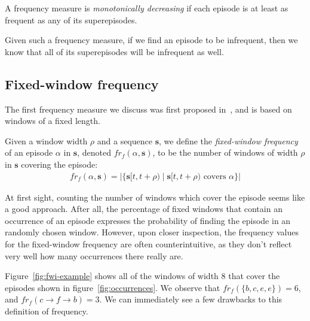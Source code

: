 \begin{definition}
A frequency measure is \emph{monotonically decreasing} if each episode is at least as frequent as any of its superepisodes.
\end{definition}

Given such a frequency measure, if we find an episode to be infrequent, then we know that all of its superepisodes will be infrequent as well.


\subsection{Fixed-window frequency}

The first frequency measure we discuss was first proposed in~\cite{mannila1997discovery}, and is based on windows of a fixed length.

\begin{definition}
Given a window width $ \rho $ and a sequence $ \boldsymbol{s} $, we define the \emph{fixed-window frequency} of an episode $ \alpha $ in $ \boldsymbol{s} $, denoted $ fr_f(\alpha, \boldsymbol{s}) $, to be the number of windows of width $ \rho $ in $ \boldsymbol{s} $ covering the episode:
\begin{align*}
fr_f(\alpha, \boldsymbol{s}) = | \{ \boldsymbol{s}[t, t + \rho) \mid \boldsymbol{s}[t, t + \rho) \text{ covers } \alpha \} |
\end{align*}
\end{definition}

At first sight, counting the number of windows which cover the episode seems like a good approach. After all, the percentage of fixed windows that contain an occurrence of an episode expresses the probability of finding the episode in an randomly chosen window. However, upon closer inspection, the frequency values for the fixed-window frequency are often counterintuitive, as they don't reflect very well how many occurrences there really are.

Figure~\ref{fig:fwi-example} shows all of the windows of width 8 that cover the episodes shown in figure~\ref{fig:occurrences}. We observe that $ fr_f(\{ b, c, e, e \}) = 6 $, and $ fr_f(c \to f \to b) = 3 $. We can immediately see a few drawbacks to this definition of frequency.

